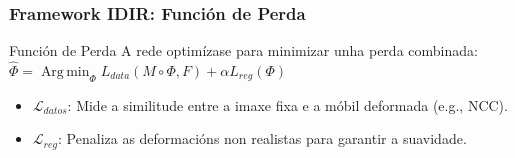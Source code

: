 \documentclass[xcolor=dvipsnames]{beamer}
\begin{document}
\begin{frame}
    \frametitle{Framework IDIR: Función de Perda}
    
    \begin{block}{Función de Perda}
        A rede optimízase para minimizar unha perda combinada:
        \vspace{0.4cm}
        \centering
        $\hat{\Phi} = \operatorname*{Arg\,min}_{\Phi} L_{data}(M \circ \Phi, F) + \alpha L_{reg}(\Phi)$
        \vspace{0.4cm}
        \begin{itemize}
            \item $\mathcal{L}_{datos}$: Mide a similitude entre a imaxe fixa e a móbil deformada (e.g., NCC).
            \item $\mathcal{L}_{reg}$: Penaliza as deformacións non realistas para garantir a suavidade.
        \end{itemize}
    \end{block}
    
\end{frame}
\end{document}
